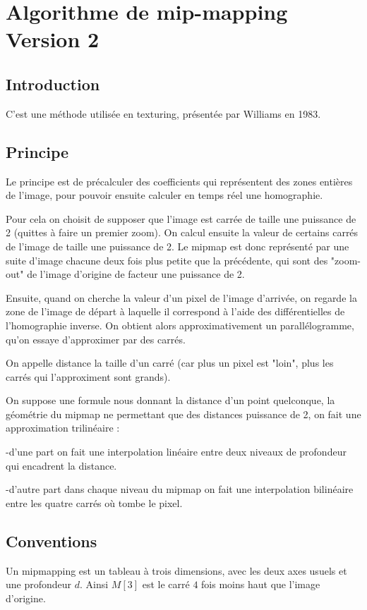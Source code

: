 \documentclass{article}
\newcommand{\se}[1]{\medbreak \medbreak \section*{#1}}
\newcommand{\sse}[1]{\medbreak \subsection*{#1}}
\begin{document}
\se{Algorithme de mip-mapping Version 2}

\sse{Introduction}

C'est une méthode utilisée en texturing, présentée par Williams en 1983.

\sse{Principe}

Le principe est de précalculer des coefficients qui représentent des zones entières de l'image, pour pouvoir ensuite calculer en temps réel une homographie. 

Pour cela on choisit de supposer que l'image est carrée de taille une puissance de 2 (quittes à faire un premier zoom). On calcul ensuite la valeur de certains carrés de l'image de taille une puissance de 2.
Le mipmap est donc représenté par une suite d'image chacune deux fois plus petite que la précédente, qui sont des "zoom-out" de l'image d'origine de facteur une puissance de 2.


Ensuite, quand on cherche la valeur d'un pixel de l'image d'arrivée, on regarde la zone de l'image de départ à laquelle il correspond à l'aide des différentielles de l'homographie inverse. On obtient alors approximativement un parallélogramme, qu'on essaye d'approximer par des carrés.


On appelle distance la taille d'un carré (car plus un pixel est "loin", plus les carrés qui l'approximent sont grands). 

On suppose une formule nous donnant la distance d'un point quelconque, la géométrie du mipmap ne permettant que des distances puissance de 2, on fait une approximation trilinéaire : 

-d'une part on fait une interpolation linéaire entre deux niveaux de profondeur qui encadrent la distance.

-d'autre part dans chaque niveau du mipmap on fait une interpolation bilinéaire entre les quatre carrés où tombe le pixel.


\sse{Conventions}

Un mipmapping est un tableau à trois dimensions, avec les deux axes usuels et une profondeur $d$.
Ainsi $M[3]$ est le carré $4$ fois moins haut que l'image d'origine. 
\end{document}
